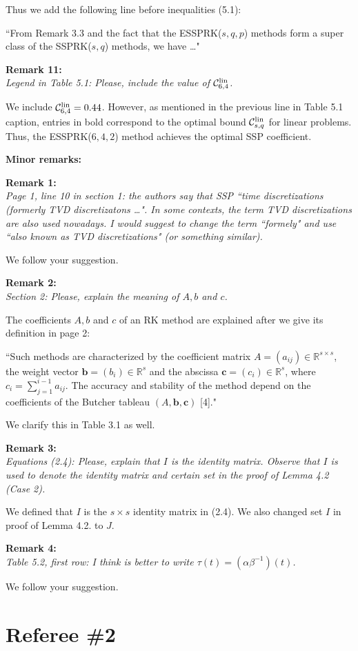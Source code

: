 \documentclass[12pt]{article}
\newcommand{\remark}[2]{\vspace{25pt} \noindent \textbf{Remark #1:\newline} \textit{#2}\vspace{15pt}}
\renewcommand{\newline}{\vspace{15pt}\\}
\newcommand{\sspcoef}{\mathcal{C}}
\newcommand{\clin}{\sspcoef^{\textnormal{lin}}_{s,q}}
\begin{document}
Thus we add the following line before inequalities (5.1):

``From Remark 3.3 and the fact that the ESSPRK($s,q,p$) methods 
form a super class of the SSPRK($s,q$) methods, we have \dots"


\remark{11}{
Legend in Table 5.1: Please, include the value of $\sspcoef^{\textnormal{lin}}_{6,4}$.}

We include $\sspcoef^{\textnormal{lin}}_{6,4}=0.44$.
However, as mentioned in the previous line in Table 5.1 caption, entries in bold correspond to 
the optimal bound $\clin$ for linear problems. Thus, the ESSPRK($6,4,2$) method achieves the 
optimal SSP coefficient.
\pagebreak

\noindent \textbf{\large Minor remarks:}

\remark{1}{
Page 1, line 10 in section 1: the authors say that SSP ``time discretizations (formerly
TVD discretizatons \dots". 
In some contexts, the term TVD discretizations are also used nowadays. 
I would suggest to change the term ``formely" and use ``also known as TVD discretizations" 
(or something similar).}

We follow your suggestion.

\remark{2}{
Section 2: Please, explain the meaning of $A, b$ and $c$.}

The coefficients $A, b$ and $c$ of an RK method are explained after we give its definition 
in page 2:

``Such methods are characterized by the coefficient matrix $A = (a_{ij}) \in 
\mathbb{R}^{s \times s}$, the weight vector $\bm{b} = (b_i) \in \mathbb{R}^s$
and the abscissa $\bm{c} = (c_i) \in \mathbb{R}^s$, where 
$c_i = \sum_{j=1}^{i-1}a_{ij}$.
The accuracy and stability of the method depend on the coefficients of the 
Butcher tableau $(A,\bm{b},\bm{c})$ [4]."

We clarify this in Table 3.1 as well.

\remark{3}{
Equations (2.4): Please, explain that $I$ is the identity matrix. Observe that $I$ is used to
denote the identity matrix and certain set in the proof of Lemma 4.2 (Case 2).}

We defined that $I$ is the $s \times s$ identity matrix in (2.4).
We also changed set $I$ in proof of Lemma 4.2. to $J$.

\remark{4}{
Table 5.2, first row: I think is better to write $\tau(t) = (\alpha\beta^{-1})(t)$.}

We follow your suggestion.

\section*{Referee \#2}
\end{document}
